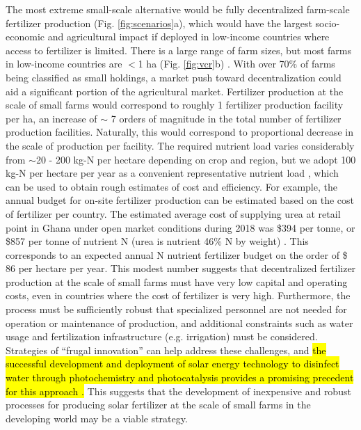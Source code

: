 The most extreme small-scale alternative would be fully decentralized farm-scale fertilizer production (Fig. \ref{fig:scenarios}a), which would have the largest socio-economic and agricultural impact if deployed in low-income countries where access to fertilizer is limited. There is a large range of farm sizes, but most farms in low-income countries are $<$1 ha (Fig. \ref{fig:vcr}b)\cite{Lowder_2016} . With over 70\% of farms being classified as small holdings, a market push toward decentralization could aid a significant portion of the agricultural market. Fertilizer production at the scale of small farms would  correspond to roughly 1 fertilizer production facility per ha, an increase of $\sim$ 7 orders of magnitude in the total number of fertilizer production facilities. Naturally, this would correspond to proportional decrease in the scale of production per facility.
The required nutrient load varies considerably from $\sim$20 - 200 kg-N per hectare depending on crop and region, but we adopt 100 kg-N per hectare per year as a convenient representative nutrient load \cite{Medford_2017}, which can be used to obtain rough estimates of cost and efficiency. For example, the annual budget for on-site fertilizer production can be estimated based on the cost of fertilizer per country. The estimated average cost of supplying urea at retail point in Ghana under open market conditions during 2018 was \$394 per tonne, or \$857 per tonne of nutrient N (urea is nutrient 46\% N by weight) \cite{africa_fert_2017}.
 This corresponds to an expected annual N nutrient fertilizer budget on the order of \$ 86 per hectare per year. This modest number suggests that decentralized fertilizer production at the scale of small farms must have very low capital and operating costs, even in countries where the cost of fertilizer is very high. Furthermore, the process must be sufficiently robust that specialized personnel are not needed for operation or maintenance of production, and additional constraints such as water usage and fertilization infrastructure (e.g. irrigation) must be considered. Strategies of ``frugal innovation'' \cite{Weyrauch_2016} can help address these challenges, and \hl{the successful development and deployment of solar energy technology to disinfect water through photochemistry and photocatalysis provides a promising precedent for this approach \cite{Lonnen_2005, McGuigan_2012}.}
 This suggests that the development of inexpensive and robust processes for producing solar fertilizer at the scale of small farms in the developing world may be a viable strategy.
 

